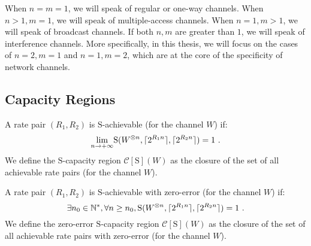 When $n=m=1$, we will speak of regular or one-way channels. When $n>1,m=1$, we will speak of multiple-access channels. When $n=1,m>1$, we will speak of broadcast channels. If both $n,m$ are greater than $1$, we will speak of interference channels. More specifically, in this thesis, we will focus on the cases of $n=2,m=1$ and $n=1,m=2$, which are at the core of the specificity of network channels.

\subsection{Capacity Regions}
\begin{definition}
  \label{defi:generalCapacityRegion}
  A rate pair $(R_1,R_2)$ is $\mathrm{S}$-achievable (for the channel $W$) if:
  \[ \underset{n \rightarrow +\infty}{\lim} \mathrm{S}(W^{\otimes n},\ceil{2^{R_1n}},\ceil{2^{R_2n}}) = 1 \ . \]
  We define the $\mathrm{S}$-capacity region $\mathcal{C}[\mathrm{S}](W)$ as the closure of the set of all achievable rate pairs (for the channel $W$).
\end{definition}

\begin{definition}
  A rate pair $(R_1,R_2)$ is $\mathrm{S}$-achievable with zero-error (for the channel $W$) if:
  \[ \exists n_0  \in \mathbb{N}^*, \forall n \geq n_0, \mathrm{S}(W^{\otimes n},\lceil2^{R_1n}\rceil,\lceil2^{R_2n}\rceil) = 1 \ . \]
  We define the zero-error $\mathrm{S}$-capacity region $\mathcal{C}[\mathrm{S}](W)$ as the closure of the set of all achievable rate pairs with zero-error (for the channel $W$).
\end{definition}


